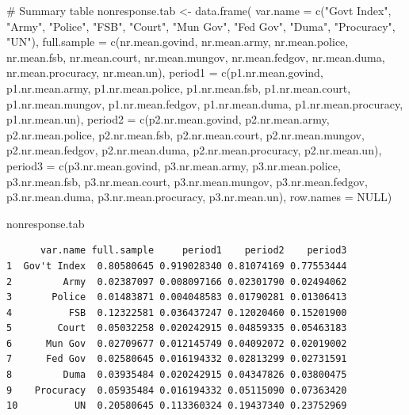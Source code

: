 \documentclass[
  letterpaper,
  DIV=11,
  numbers=noendperiod]{scrartcl}
\newenvironment{Shaded}{\begin{snugshade}}{\end{snugshade}}
\newcommand{\AttributeTok}[1]{\textcolor[rgb]{0.40,0.45,0.13}{#1}}
\newcommand{\CommentTok}[1]{\textcolor[rgb]{0.37,0.37,0.37}{#1}}
\newcommand{\ConstantTok}[1]{\textcolor[rgb]{0.56,0.35,0.01}{#1}}
\newcommand{\FunctionTok}[1]{\textcolor[rgb]{0.28,0.35,0.67}{#1}}
\newcommand{\NormalTok}[1]{\textcolor[rgb]{0.00,0.23,0.31}{#1}}
\newcommand{\OtherTok}[1]{\textcolor[rgb]{0.00,0.23,0.31}{#1}}
\newcommand{\StringTok}[1]{\textcolor[rgb]{0.13,0.47,0.30}{#1}}
\begin{document}
\begin{Shaded}
\begin{Highlighting}[]
\CommentTok{\# Summary table}
\NormalTok{nonresponse.tab }\OtherTok{\textless{}{-}} \FunctionTok{data.frame}\NormalTok{(}
  \AttributeTok{var.name =} \FunctionTok{c}\NormalTok{(}\StringTok{"Gov\textquotesingle{}t Index"}\NormalTok{, }\StringTok{"Army"}\NormalTok{, }\StringTok{"Police"}\NormalTok{, }\StringTok{"FSB"}\NormalTok{, }\StringTok{"Court"}\NormalTok{, }
               \StringTok{"Mun Gov"}\NormalTok{, }\StringTok{"Fed Gov"}\NormalTok{, }\StringTok{"Duma"}\NormalTok{, }\StringTok{"Procuracy"}\NormalTok{, }\StringTok{"UN"}\NormalTok{),}
  \AttributeTok{full.sample =} \FunctionTok{c}\NormalTok{(nr.mean.govind, nr.mean.army, nr.mean.police, nr.mean.fsb, nr.mean.court,}
\NormalTok{                  nr.mean.mungov, nr.mean.fedgov, nr.mean.duma, nr.mean.procuracy, nr.mean.un),}
  \AttributeTok{period1 =} \FunctionTok{c}\NormalTok{(p1.nr.mean.govind, p1.nr.mean.army, p1.nr.mean.police, p1.nr.mean.fsb, p1.nr.mean.court,}
\NormalTok{              p1.nr.mean.mungov, p1.nr.mean.fedgov, p1.nr.mean.duma, p1.nr.mean.procuracy,}
\NormalTok{              p1.nr.mean.un),}
  \AttributeTok{period2 =} \FunctionTok{c}\NormalTok{(p2.nr.mean.govind, p2.nr.mean.army, p2.nr.mean.police, p2.nr.mean.fsb, p2.nr.mean.court,}
\NormalTok{              p2.nr.mean.mungov, p2.nr.mean.fedgov, p2.nr.mean.duma, p2.nr.mean.procuracy, }
\NormalTok{              p2.nr.mean.un),}
  \AttributeTok{period3 =} \FunctionTok{c}\NormalTok{(p3.nr.mean.govind, p3.nr.mean.army, p3.nr.mean.police, p3.nr.mean.fsb, p3.nr.mean.court,}
\NormalTok{              p3.nr.mean.mungov, p3.nr.mean.fedgov, p3.nr.mean.duma, p3.nr.mean.procuracy, }
\NormalTok{              p3.nr.mean.un),}
  \AttributeTok{row.names =} \ConstantTok{NULL}\NormalTok{)}

\NormalTok{nonresponse.tab}
\end{Highlighting}
\end{Shaded}

\begin{verbatim}
      var.name full.sample     period1    period2    period3
1  Gov't Index  0.80580645 0.919028340 0.81074169 0.77553444
2         Army  0.02387097 0.008097166 0.02301790 0.02494062
3       Police  0.01483871 0.004048583 0.01790281 0.01306413
4          FSB  0.12322581 0.036437247 0.12020460 0.15201900
5        Court  0.05032258 0.020242915 0.04859335 0.05463183
6      Mun Gov  0.02709677 0.012145749 0.04092072 0.02019002
7      Fed Gov  0.02580645 0.016194332 0.02813299 0.02731591
8         Duma  0.03935484 0.020242915 0.04347826 0.03800475
9    Procuracy  0.05935484 0.016194332 0.05115090 0.07363420
10          UN  0.20580645 0.113360324 0.19437340 0.23752969
\end{verbatim}
\end{document}
